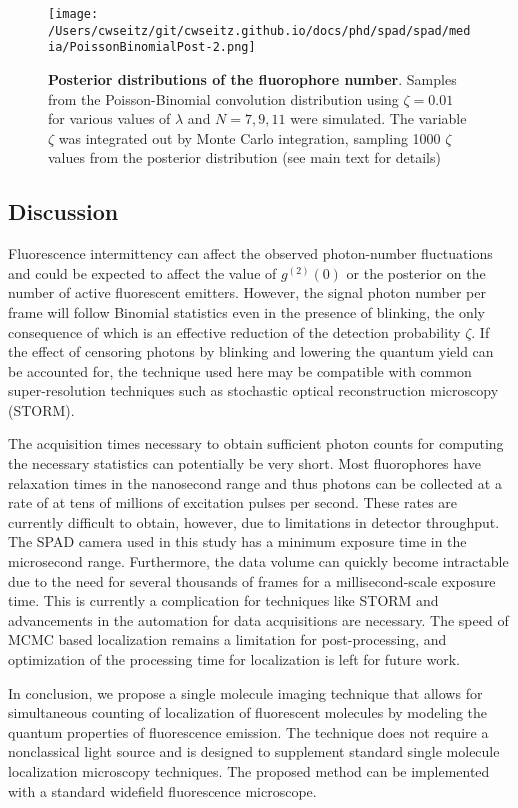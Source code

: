 \begin{figure*}[t]
\centering
\texttt{[image: /Users/cwseitz/git/cwseitz.github.io/docs/phd/spad/spad/media/PoissonBinomialPost-2.png]}
\caption{\textbf{Posterior distributions of the fluorophore number}. Samples from the Poisson-Binomial convolution distribution using $\zeta=0.01$ for various values of $\lambda$ and $N=7,9,11$ were simulated. The variable $\zeta$ was integrated out by Monte Carlo integration, sampling 1000 $\zeta$ values from the posterior distribution (see main text for details)}
\label{fig:fig10}
\end{figure*}    

\subsection{Discussion}

Fluorescence intermittency can affect the observed photon-number fluctuations and could be expected to affect the value of $g^{(2)}(0)$ or the posterior on the number of active fluorescent emitters. However, the signal photon number per frame will follow Binomial statistics even in the presence of blinking, the only consequence of which is an effective reduction of the detection probability $\zeta$. If the effect of censoring photons by blinking and lowering the quantum yield can be accounted for, the technique used here may be compatible with common super-resolution techniques such as stochastic optical reconstruction microscopy (STORM). 

The acquisition times necessary to obtain sufficient photon counts for computing the necessary statistics can potentially be very short. Most fluorophores have relaxation times in the nanosecond range and thus photons can be collected at a rate of at tens of millions of excitation pulses per second. These rates are currently difficult to obtain, however, due to limitations in detector throughput. The SPAD camera used in this study has a minimum exposure time in the microsecond range. Furthermore, the data volume can quickly become intractable due to the need for several thousands of frames for a millisecond-scale exposure time. This is currently a complication for techniques like STORM and advancements in the automation for data acquisitions are necessary. The speed of MCMC based localization remains a limitation for post-processing, and optimization of the processing time for localization is left for future work. 

In conclusion, we propose a single molecule imaging technique that allows for simultaneous counting of localization of fluorescent molecules by modeling the quantum properties of fluorescence emission. The technique does not require a nonclassical light source and is designed to supplement standard single molecule localization microscopy techniques. The proposed method can be implemented with a standard widefield fluorescence microscope.


